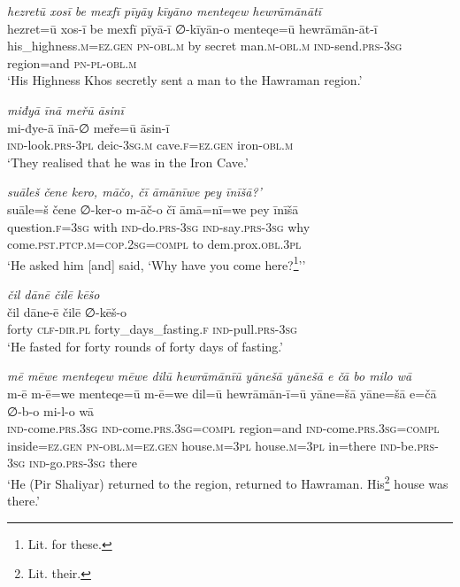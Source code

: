 \ea \label{ŽP.129}
\textit{hezretū xosī be mexfī pīyāy kīyāno menteqew hewrāmānātī} \\ 
\gll hezret=ū xos-ī be mexfī pīyā-ī ∅-kīyān-o menteqe=ū hewrāmān-āt-ī \\ 
 his\_highness\textsc{.m}\textsc{\textsc{=ez.gen}} \textsc{pn}\textsc{-obl}\textsc{.m} by secret man\textsc{.m}\textsc{-obl}\textsc{.m} \textsc{ind-}send\textsc{.prs}\textsc{-3sg} region=and \textsc{pn}\textsc{\textsc{-pl}}\textsc{-obl}\textsc{.m} \\ 
\glt `His Highness Khos secretly sent a man to the Hawraman region.'
\z 
 
\ea \label{ŽP.131}
\textit{miđyā īnā meřū āsinī} \\ 
\gll mi-đye-ā īnā-∅ meře=ū āsin-ī \\ 
 \textsc{ind-}look\textsc{.prs}\textsc{-3pl} deic\textsc{-3sg}\textsc{.m} cave\textsc{.f}\textsc{\textsc{=ez.gen}} iron\textsc{-obl}\textsc{.m} \\ 
\glt `They realised that he was in the Iron Cave.'
\z 
 
\ea \label{ŽP.135}
\textit{suāleš čene kero, māčo, čī āmānīwe pey īnīšā?’} \\ 
\gll suāle=š čene ∅-ker-o m-āč-o čī āmā=nī=we pey īnīšā \\ 
 question\textsc{.f}\textsc{=3sg} with \textsc{ind-}do\textsc{.prs}\textsc{-3sg} \textsc{ind-}say\textsc{.prs}\textsc{-3sg} why come\textsc{.pst}\textsc{.ptcp}\textsc{.m}\textsc{=cop}\textsc{.\textsc{2sg}}\textsc{=compl} to dem.prox\textsc{.obl}\textsc{.3pl} \\ 
\glt `He asked him [and] said, ‘Why have you come here?\footnote{Lit. for these.}’'
\z 
 
\ea \label{ŽP.140}
\textit{čil dānē čilē kēšo} \\ 
\gll čil dāne-ē čilē ∅-kēš-o \\ 
 forty \textsc{clf}\textsc{-dir}\textsc{.pl} forty\_days\_fasting\textsc{.f} \textsc{ind-}pull\textsc{.prs}\textsc{-3sg} \\ 
\glt `He fasted for forty rounds of forty days of fasting.'
\z 
 
\ea \label{ŽP.141}
\textit{mē mēwe menteqew mēwe dilū hewrāmānīū yānešā yānešā e čā bo milo wā} \\ 
\gll m-ē m-ē=we menteqe=ū m-ē=we dil=ū hewrāmān-ī=ū yāne=šā yāne=šā e=čā ∅-b-o mi-l-o wā \\ 
 \textsc{ind-}come\textsc{.prs}\textsc{.3sg} \textsc{ind-}come\textsc{.prs}\textsc{.3sg}\textsc{=compl} region=and \textsc{ind-}come\textsc{.prs}\textsc{.3sg}\textsc{=compl} inside\textsc{\textsc{=ez.gen}} \textsc{pn}\textsc{-obl}\textsc{.m}\textsc{\textsc{=ez.gen}} house\textsc{.m}\textsc{=3pl} house\textsc{.m}\textsc{=3pl} in=there \textsc{ind-}be\textsc{.prs}\textsc{-3sg} \textsc{ind-}go\textsc{.prs}\textsc{-3sg} there \\ 
\glt `He (Pir Shaliyar) returned to the region, returned to Hawraman. His\footnote{Lit. their.} house was there.'
\z 
 
